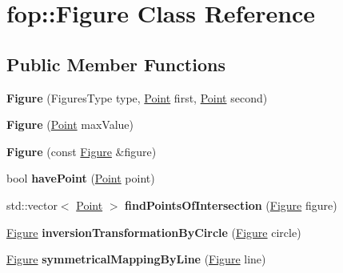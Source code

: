 \hypertarget{classfop_1_1_figure}{}\section{fop\+:\+:Figure Class Reference}
\label{classfop_1_1_figure}
\subsection*{Public Member Functions}
\begin{DoxyCompactItemize}
\item 
\mbox{\label{classfop_1_1_figure_af2154691492fa9cc825c7b4fc3224567}} 
{\bfseries Figure} (Figures\+Type type, \mbox{\hyperlink{structtdp_1_1_point}{Point}} first, \mbox{\hyperlink{structtdp_1_1_point}{Point}} second)
\item 
\mbox{\label{classfop_1_1_figure_a2e24606aff7c6e923d3b1db4cb7f39df}} 
{\bfseries Figure} (\mbox{\hyperlink{structtdp_1_1_point}{Point}} max\+Value)
\item 
\mbox{\label{classfop_1_1_figure_a2cc70342facf7064e5724651e351046b}} 
{\bfseries Figure} (const \mbox{\hyperlink{classfop_1_1_figure}{Figure}} \&figure)
\item 
\mbox{\label{classfop_1_1_figure_adaa195836173f677f9207c0b5f9c84fe}} 
bool {\bfseries have\+Point} (\mbox{\hyperlink{structtdp_1_1_point}{Point}} point)
\item 
\mbox{\label{classfop_1_1_figure_a65bb58cd0c1cd84f8e8134d3118e760a}} 
std\+::vector$<$ \mbox{\hyperlink{structtdp_1_1_point}{Point}} $>$ {\bfseries find\+Points\+Of\+Intersection} (\mbox{\hyperlink{classfop_1_1_figure}{Figure}} figure)
\item 
\mbox{\label{classfop_1_1_figure_aae228e84324267f99ea7ece5067c94d9}} 
\mbox{\hyperlink{classfop_1_1_figure}{Figure}} {\bfseries inversion\+Transformation\+By\+Circle} (\mbox{\hyperlink{classfop_1_1_figure}{Figure}} circle)
\item 
\mbox{\label{classfop_1_1_figure_a7f1666507e49eb3c2a79dc33ae49eb90}} 
\mbox{\hyperlink{classfop_1_1_figure}{Figure}} {\bfseries symmetrical\+Mapping\+By\+Line} (\mbox{\hyperlink{classfop_1_1_figure}{Figure}} line)
\end{DoxyCompactItemize}

